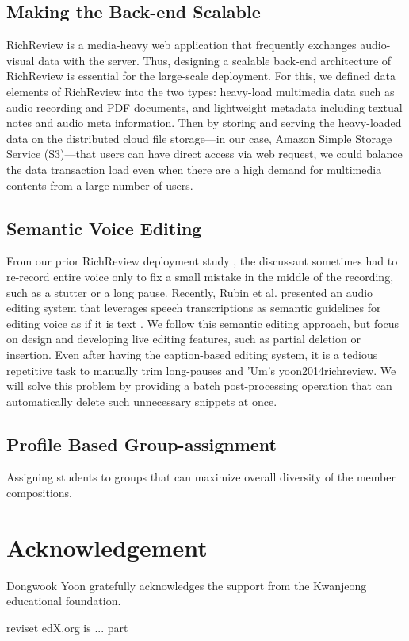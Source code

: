 \documentclass{sigchi}
\begin{document}
\subsection{Making the Back-end Scalable}
RichReview is a media-heavy web application that frequently exchanges audio-visual data with the server.
Thus, designing a scalable back-end architecture of RichReview is essential for the large-scale deployment.
For this, we defined data elements of RichReview into the two types: heavy-load multimedia data such as audio recording and PDF documents, and lightweight metadata including textual notes and audio meta information.
Then by storing and serving the heavy-loaded data on the distributed cloud file storage---in our case, Amazon Simple Storage Service (S3)---that users can have direct access via web request, we could balance the data transaction load even when there are a high demand for multimedia contents from a large number of users.

\subsection{Semantic Voice Editing}
From our prior RichReview deployment study \cite{yoon2015richreview}, the discussant sometimes had to re-record entire voice only to fix a small mistake in the middle of the recording, such as a stutter or a long pause.
Recently, Rubin et al. presented an audio editing system that leverages speech transcriptions as semantic guidelines for editing voice as if it is text \cite{rubin2013content}.
We follow this semantic editing approach, but focus on design and developing live editing features, such as partial deletion or insertion.
Even after having the caption-based editing system, it is a tedious repetitive task to manually trim long-pauses and 'Um's {yoon2014richreview}.
We will solve this problem by providing a batch post-processing operation that can automatically delete such unnecessary snippets at once.

\subsection{Profile Based Group-assignment}
Assigning students to groups that can maximize overall diversity of the member compositions.

\section{Acknowledgement} 
Dongwook Yoon gratefully acknowledges the support from the Kwanjeong educational foundation.

reviset edX.org is ... part




\end{document}
